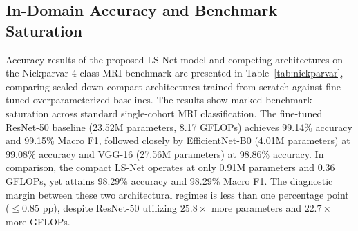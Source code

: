 \documentclass[journal]{IEEEtran}
\begin{document}
\subsection{In-Domain Accuracy and Benchmark Saturation}

Accuracy results of the proposed LS-Net model and competing architectures on the Nickparvar 4-class MRI benchmark are presented in Table~\ref{tab:nickparvar}, comparing scaled-down compact architectures trained from scratch against fine-tuned overparameterized baselines. The results show marked benchmark saturation across standard single-cohort MRI classification. The fine-tuned ResNet-50 baseline (23.52M parameters, 8.17 GFLOPs) achieves 99.14\% accuracy and 99.15\% Macro F1, followed closely by EfficientNet-B0 (4.01M parameters) at 99.08\% accuracy and VGG-16 (27.56M parameters) at 98.86\% accuracy. In comparison, the compact LS-Net operates at only 0.91M parameters and 0.36 GFLOPs, yet attains 98.29\% accuracy and 98.29\% Macro F1. The diagnostic margin between these two architectural regimes is less than one percentage point ($\le 0.85$ pp), despite ResNet-50 utilizing $25.8\times$ more parameters and $22.7\times$ more GFLOPs.
\end{document}
